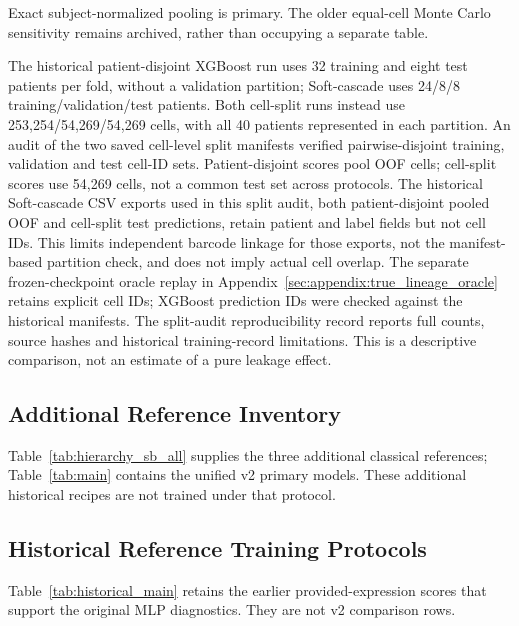 Exact subject-normalized pooling is primary. The older equal-cell Monte
Carlo sensitivity remains archived, rather than occupying a separate table.


The historical patient-disjoint XGBoost run uses 32 training and eight test
patients per fold, without a validation partition; Soft-cascade uses 24/8/8
training/validation/test patients. Both cell-split runs instead use
253,254/54,269/54,269 cells, with all 40 patients represented in each partition.
An audit of the two saved cell-level split manifests verified pairwise-disjoint
training, validation and test cell-ID sets. Patient-disjoint scores pool \numcells{}
OOF cells; cell-split scores use 54,269 cells, not a common test set across
protocols. The historical Soft-cascade CSV exports used in this split audit,
both patient-disjoint pooled OOF and cell-split test predictions, retain
patient and label fields but not cell IDs. This limits independent barcode
linkage for those exports, not the manifest-based partition check, and does
not imply actual cell overlap. The separate frozen-checkpoint oracle replay
in Appendix~\ref{sec:appendix:true_lineage_oracle} retains explicit cell IDs;
XGBoost prediction IDs were checked against the historical manifests.
The split-audit reproducibility record reports full counts, source hashes
and historical training-record limitations. This is a descriptive comparison,
not an estimate of a pure leakage effect.


\subsection{Additional Reference Inventory}
\label{sec:appendix:consistency}

Table~\ref{tab:hierarchy_sb_all} supplies the three additional classical
references; Table~\ref{tab:main} contains the unified v2 primary models.
These additional historical recipes are not trained under that protocol.




\subsection{Historical Reference Training Protocols}
\label{sec:appendix:main_protocols}

Table~\ref{tab:historical_main} retains the earlier provided-expression scores
that support the original MLP diagnostics. They are not v2 comparison rows.


